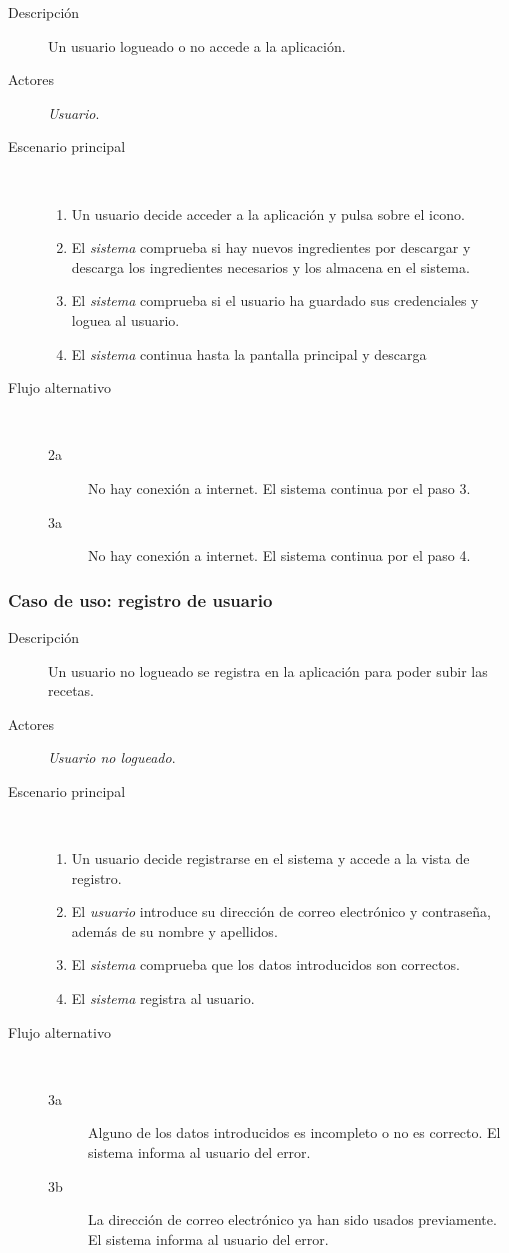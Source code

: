 \begin{description}
\item[Descripción] Un usuario logueado o no accede a la aplicación.
\item[Actores] \textit{Usuario}.
\item[Escenario principal] $\quad$
  \begin{enumerate}
  \item Un usuario decide acceder a la aplicación y pulsa sobre el icono.
  \item El \textit{sistema} comprueba si hay nuevos ingredientes por descargar
  y descarga los ingredientes necesarios y los almacena en el sistema.
  \item El \textit{sistema} comprueba si el usuario ha guardado sus credenciales
  y loguea al usuario.
  \item El \textit{sistema} continua hasta la pantalla principal y descarga
  \end{enumerate}
\item[Flujo alternativo] $\quad$
  \begin{description}
  \item[2a] No hay conexión a internet. El sistema continua por el paso 3.
  \item[3a] No hay conexión a internet. El sistema continua por el paso 4.
  \end{description}
\end{description}


\subsubsection{Caso de uso: registro de usuario}

\begin{description}
\item[Descripción] Un usuario no logueado se registra en la aplicación para
poder subir las recetas.
\item[Actores] \textit{Usuario no logueado}.
\item[Escenario principal] $\quad$
  \begin{enumerate}
  \item Un usuario decide registrarse en el sistema y accede a la vista de
  registro.
  \item El \textit{usuario} introduce su dirección de correo electrónico y
  contraseña, además de su nombre y apellidos.
  \item El \textit{sistema} comprueba que los datos introducidos son correctos.
  \item El \textit{sistema} registra al usuario.
  \end{enumerate}
\item[Flujo alternativo] $\quad$
  \begin{description}
  \item[3a] Alguno de los datos introducidos es incompleto o no es correcto. El
    sistema informa al usuario del error.
  \item[3b] La dirección de correo electrónico ya han sido usados previamente.
  El sistema informa al usuario del error.
  \end{description}
\end{description}


